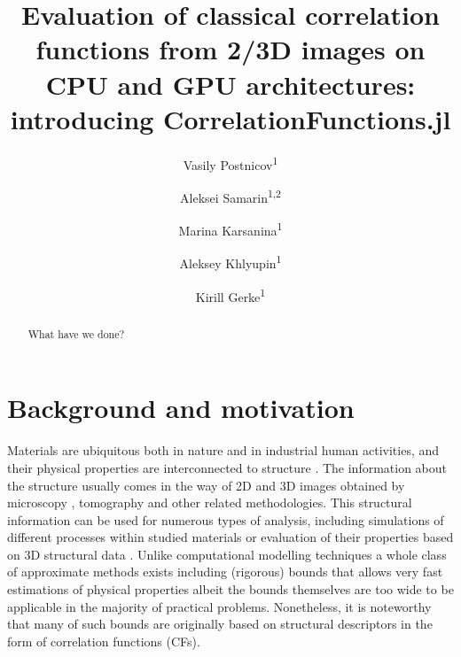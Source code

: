 \documentclass[reprint,amsmath,amssymb,aps,pre,showkeys,showpacs,nofootinbib]{revtex4-1}
\begin{document}

\author{Vasily Postnicov\textsuperscript{1}}
\author{Aleksei Samarin\textsuperscript{1,2}}
\author{Marina Karsanina\textsuperscript{1}}
\author{Aleksey Khlyupin\textsuperscript{1}}
\author{Kirill Gerke\textsuperscript{1}}


\title{Evaluation of classical correlation functions from 2/3D images on CPU and
  GPU architectures: introducing CorrelationFunctions.jl}

\begin{abstract}
  What have we done?
\end{abstract}

\maketitle

\section{Background and motivation}
\label{sec:background}
Materials are ubiquitous both in nature and in industrial human activities, and
their physical properties are interconnected to structure
\cite{Torquato_book,Sahimi_book}. The information about the structure usually
comes in the way of 2D and 3D images obtained by microscopy
\cite{moussaoui2018,neumann2019,FIB-SEMpaper}, tomography \cite{xctmat_book} and
other related methodologies.  This structural information can be used for
numerous types of analysis, including simulations of different processes within
studied materials or evaluation of their properties based on 3D structural data
\cite{youssef2005,Miao2017,FDMSS}. Unlike computational modelling techniques a
whole class of approximate methods exists including (rigorous) bounds that
allows very fast estimations of physical properties
\cite{eshelby1957,berryman1986use,rozanski2023} albeit the bounds themselves are
too wide to be applicable in the majority of practical problems. Nonetheless, it
is noteworthy that many of such bounds are originally based on structural
descriptors in the form of correlation functions (CFs).
\end{document}
